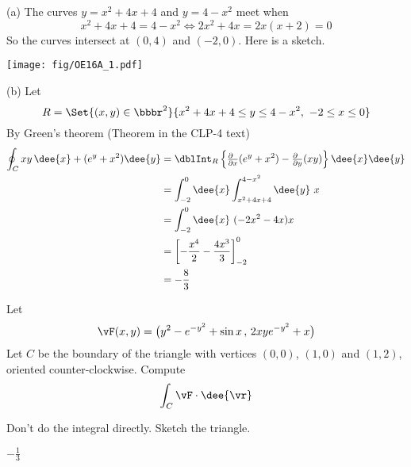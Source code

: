 \begin{solution}  (a)
The curves $y = x^2 + 4x + 4$ and $y = 4 - x^2$ meet when
\begin{equation*}
x^2 + 4x + 4 = 4 - x^2
\iff 2x^2  +4x = 2x(x+2) = 0
\end{equation*}
So the curves intersect at $(0,4)$ and  $(-2,0)$. Here is a sketch.
\begin{center}
       \texttt{[image: fig/OE16A\_1.pdf]}
\end{center}


\noindent (b) Let
\begin{equation*}
R=\Set{(x,y)\in\bbbr^2}{ x^2+4x+4\le y\le  4-x^2,\ -2\le x\le 0}
\end{equation*}
By Green's theorem (Theorem  in the CLP-4 text)
\begin{align*}
\oint_C xy\, \dee{x} + (e^y + x^2 ) \dee{y}
&=\dblInt_R \left\{
  \tfrac{\partial\hfill}{\partial x}(e^y+x^2)
  -\tfrac{\partial\hfill}{\partial y}(xy)
\right\}\dee{x}\dee{y} \\
&= \int_{-2}^0\dee{x} \int_{x^2+4x+4}^{4-x^2}\dee{y} \ x \\
&= \int_{-2}^0\dee{x}\ (-2x^2-4x) x \\
&=\left[-\frac{x^4}{2} -\frac{4x^3}{3}\right]^0_{-2} \\
&=-\frac{8}{3}
\end{align*}
\end{solution}

\begin{question}[M317 2010D] %
Let
\begin{equation*}
\vF(x, y) = \big(y^2 - e^{-y^2} + \sin x\,,\, 2xye^{-y^2} + x\big)
\end{equation*}
Let $C$ be the boundary of the triangle with vertices $(0, 0)$, $(1, 0)$ and
$(1, 2)$, oriented counter-clockwise. Compute
\begin{equation*}
\int_C \vF\cdot\dee{\vr}
\end{equation*}
\end{question}

\begin{hint}
Don't do the integral directly. Sketch the triangle.
\end{hint}

\begin{answer}
$-\frac{1}{3}$
\end{answer}

